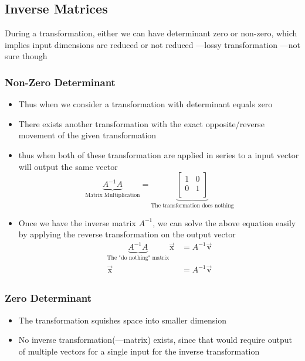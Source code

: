 \documentclass[a4paper]{article}
\begin{document}
\subsection{Inverse Matrices}
During a transformation, either we can have determinant zero or non-zero,
which implies input dimensions are reduced or not reduced
---lossy transformation ---not sure though

\subsubsection{Non-Zero Determinant}
\begin{itemize}
	\item Thus when we consider a transformation with determinant equals zero
	\item There exists another transformation with the exact opposite/reverse
	      \linebreak movement of the given transformation
	\item thus when both of these transformation are applied in series
	      to a input vector will output the same vector
	      \[
		      \underbrace{A^{-1} A}
		      _{\text{Matrix Multiplication}}
		      = \underbrace{
			      \begin{bmatrix} 1 & 0 \\
                0 & 1 \\\end{bmatrix}
		      }_{\text{The transformation does nothing}}
	      \]
	\item Once we have the inverse matrix $A^{-1}$, we can solve the
	      above equation \newline easily by applying the
	      reverse transformation on the output vector
	      \begin{align*}
		      \underbrace{A^{-1} A }
		      _{\text{The "do nothing" matrix}}
		      \vec{\text{x}}
		       & = A^{-1} \vec{\text{v}} \\
		      \vec{\text{x}}
		       & = A^{-1} \vec{\text{v}} \\
	      \end{align*}
\end{itemize}

\subsubsection{Zero Determinant}
\begin{itemize}
	\item The transformation squishes space into smaller dimension
	\item No inverse transformation(---matrix) exists, since that
	      would require \newline output of multiple vectors for a
	      single input for the inverse transformation
\end{itemize}
\end{document}
